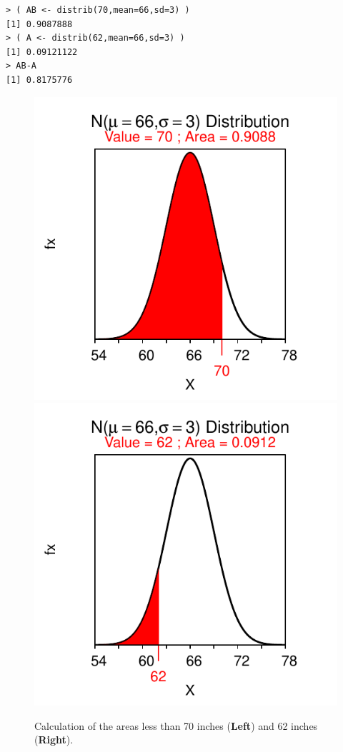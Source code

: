 \documentclass[10pt,openany]{book}\usepackage[]{graphicx}\usepackage[]{color}
\makeatletter
\newenvironment{kframe}{%
 \def\at@end@of@kframe{}%
 \ifinner\ifhmode%
  \def\at@end@of@kframe{\end{minipage}}%
  \begin{minipage}{\columnwidth}%
 \fi\fi%
 \def\FrameCommand##1{\hskip\@totalleftmargin \hskip-\fboxsep
 \colorbox{shadecolor}{##1}\hskip-\fboxsep
     \hskip-\linewidth \hskip-\@totalleftmargin \hskip\columnwidth}%
 \MakeFramed {\advance\hsize-\width
   \@totalleftmargin\z@ \linewidth\hsize
   \@setminipage}}%
 {\par\unskip\endMakeFramed%
 \at@end@of@kframe}
\newenvironment{knitrout}{}{} %
\makeatother
\begin{document}
\begin{knitrout}
\color{fgcolor}\begin{kframe}
\begin{verbatim}
> ( AB <- distrib(70,mean=66,sd=3) )
[1] 0.9087888
> ( A <- distrib(62,mean=66,sd=3) )
[1] 0.09121122
> AB-A
[1] 0.8175776
\end{verbatim}
\end{kframe}\begin{figure}[hbtp]

{\centering \includegraphics[width=.4\linewidth]{Figs/NormZCalc3-1} 
\includegraphics[width=.4\linewidth]{Figs/NormZCalc3-2} 

}

\caption[Calculation of the areas less than 70 inches (\textbf{Left}) and 62 inches (\textbf{Right})]{Calculation of the areas less than 70 inches (\textbf{Left}) and 62 inches (\textbf{Right}).}\label{fig:NormZCalc3}
\end{figure}


\end{knitrout}

\end{document}
